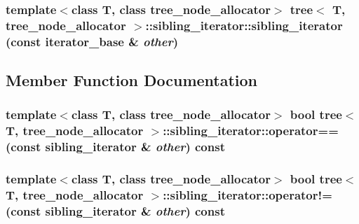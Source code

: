 \hypertarget{classtree_1_1sibling__iterator_093ea4798a85b0d52e5db20a876bc0d3}{
\subsubsection{\setlength{\rightskip}{0pt plus 5cm}template$<$class T, class tree\_\-node\_\-allocator$>$ {\bf tree}$<$ T, tree\_\-node\_\-allocator $>$::sibling\_\-iterator::sibling\_\-iterator (const {\bf iterator\_\-base} \& {\em other})}}
\label{classtree_1_1sibling__iterator_093ea4798a85b0d52e5db20a876bc0d3}




\subsection{Member Function Documentation}
\hypertarget{classtree_1_1sibling__iterator_f235d7b64b7d2654437482bab80c797b}{
\subsubsection{\setlength{\rightskip}{0pt plus 5cm}template$<$class T, class tree\_\-node\_\-allocator$>$ bool {\bf tree}$<$ T, tree\_\-node\_\-allocator $>$::sibling\_\-iterator::operator== (const {\bf sibling\_\-iterator} \& {\em other}) const}}
\label{classtree_1_1sibling__iterator_f235d7b64b7d2654437482bab80c797b}


\hypertarget{classtree_1_1sibling__iterator_2f4b2c5112c9d16f65852bc84d34c9c9}{
\subsubsection{\setlength{\rightskip}{0pt plus 5cm}template$<$class T, class tree\_\-node\_\-allocator$>$ bool {\bf tree}$<$ T, tree\_\-node\_\-allocator $>$::sibling\_\-iterator::operator!= (const {\bf sibling\_\-iterator} \& {\em other}) const}}
\label{classtree_1_1sibling__iterator_2f4b2c5112c9d16f65852bc84d34c9c9}


